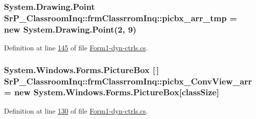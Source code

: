 \hypertarget{class_sr_p___classroom_inq_1_1frm_classrrom_inq_a019be294be5d02bea4369298d2a135db}{
\subsubsection[{picbx\-\_\-arr\-\_\-tmp}]{\setlength{\rightskip}{0pt plus 5cm}\-System.\-Drawing.\-Point {\bf \-Sr\-P\-\_\-\-Classroom\-Inq\-::frm\-Classrrom\-Inq\-::picbx\-\_\-arr\-\_\-tmp} = new \-System.\-Drawing.\-Point(2, 9)}}
\label{class_sr_p___classroom_inq_1_1frm_classrrom_inq_a019be294be5d02bea4369298d2a135db}


\-Definition at line \hyperlink{_form1-dyn-ctrls_8cs_source_l00145}{145} of file \hyperlink{_form1-dyn-ctrls_8cs_source}{\-Form1-\/dyn-\/ctrls.\-cs}.

\hypertarget{class_sr_p___classroom_inq_1_1frm_classrrom_inq_a4d179283a68569b1220534d91ddcf6d1}{
\subsubsection[{picbx\-\_\-\-Conv\-View\-\_\-arr}]{\setlength{\rightskip}{0pt plus 5cm}\-System.\-Windows.\-Forms.\-Picture\-Box \mbox{[}$\,$\mbox{]} {\bf \-Sr\-P\-\_\-\-Classroom\-Inq\-::frm\-Classrrom\-Inq\-::picbx\-\_\-\-Conv\-View\-\_\-arr} = new \-System.\-Windows.\-Forms.\-Picture\-Box\mbox{[}{\bf class\-Size}\mbox{]}}}
\label{class_sr_p___classroom_inq_1_1frm_classrrom_inq_a4d179283a68569b1220534d91ddcf6d1}


\-Definition at line \hyperlink{_form1-dyn-ctrls_8cs_source_l00130}{130} of file \hyperlink{_form1-dyn-ctrls_8cs_source}{\-Form1-\/dyn-\/ctrls.\-cs}.


